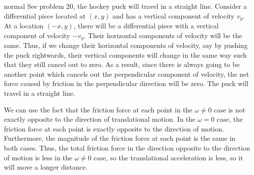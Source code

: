 \begin{solution}{normal}
See problem 20, the hockey puck will travel in a straight line. Consider a differential piece located at $(x,y)$ and has a vertical component of velocity $v_y$. At a location $(-x,y)$, there will be a differential piece with a vertical component of velocity $-v_y$. Their horizontal components of velocity will be the same. Thus, if we change their horizontal components of velocity, say by pushing the puck rightwards, their vertical components will change in the same way such that they still cancel out to zero. As a result, since there is always going to be another point which cancels out the perpendicular component of velocity, the net force caused by friction in the perpendicular direction will be zero. The puck will travel in a straight line.
\vspace{2mm}

We can use the fact that the friction force at each point in the $\omega \neq 0$ case is not exactly opposite to the direction of translational motion. In the $\omega=0$ case, the friction force at each point is exactly opposite to the direction of motion. Furthermore, the magnitude of the friction force at each point is the same in both cases. Thus, the total friction force in the direction opposite to the direction of motion is less in the $\omega \neq 0$ case, so the translational acceleration is less, so it will move a longer distance.
\end{solution}
